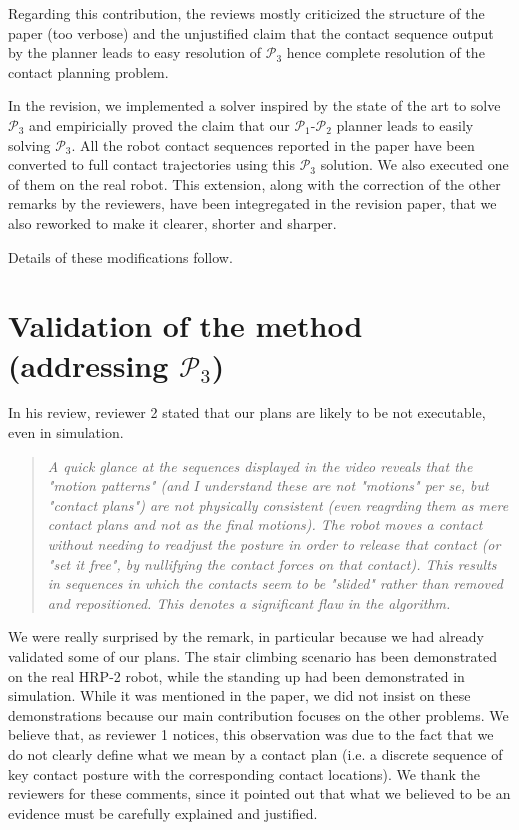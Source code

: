 \documentclass[12pt]{article}
\begin{document}
Regarding this contribution, the reviews mostly criticized the structure of the paper (too verbose) and the unjustified claim that the contact sequence output by the planner leads to easy resolution of $\mathcal{P}_3$ hence complete resolution of the contact planning problem.

In the revision, we implemented a solver inspired by the state of the art to solve $\mathcal{P}_3$ and empiricially proved the claim that our $\mathcal{P}_1$-$\mathcal{P}_2$ planner leads to easily solving $\mathcal{P}_3$. 
All the robot contact sequences reported in the paper have been converted to full contact trajectories using this $\mathcal{P}_3$ solution.
We also executed one of them on the real robot.
This extension, along with the correction of the other remarks by the reviewers, have been integregated in the revision paper, that we also reworked to make it clearer, shorter and sharper.

Details of these modifications follow.

\section{Validation of the method (addressing  $\mathcal{P}_3$) }
In his review, reviewer 2 stated that our plans are likely to be not executable, even in simulation.

\begin{quote}
  \textit{A quick glance at the sequences displayed in the video reveals that the "motion patterns" (and I understand these are not "motions" per se, but "contact plans") are not physically consistent (even reagrding them as mere contact plans and not as the final motions). The robot moves a contact without needing to readjust the posture in order to release that contact (or "set it free", by nullifying the contact forces on that contact). This results in sequences in which the contacts seem to be "slided" rather than removed and repositioned. This denotes a significant flaw in the algorithm.   }
\end{quote}

We were really surprised by the remark, in particular because we had already validated some of our plans.
The stair climbing scenario has been demonstrated on the real HRP-2 robot, while the standing up had been demonstrated in simulation. 
While it was mentioned in the paper, we did not insist on these demonstrations because our main contribution focuses on the other problems. 
We believe that, as reviewer 1 notices, this observation was due to the fact that we do not clearly define what we mean by a contact plan (i.e. a discrete sequence of key contact posture with the corresponding contact locations).
We thank the reviewers for these comments, since it pointed out that what we believed to be an evidence must be carefully explained and justified.
\end{document}
